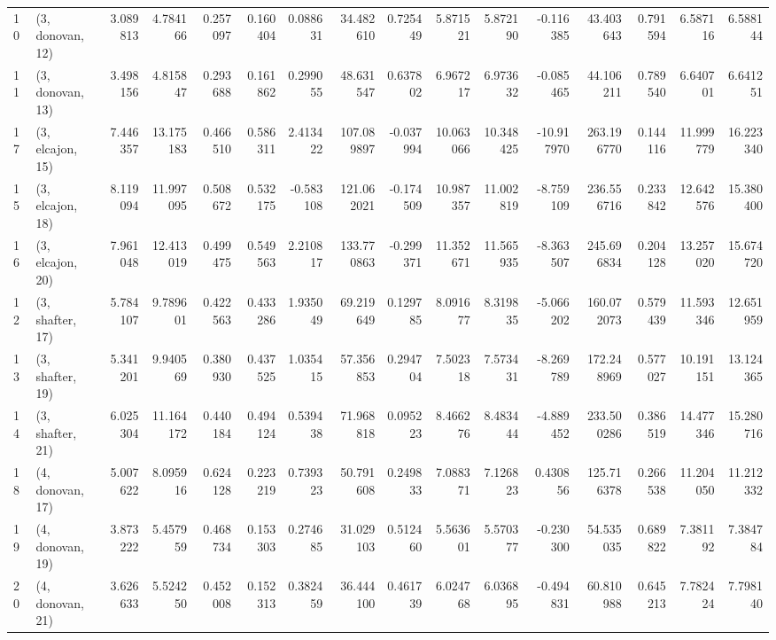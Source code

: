 \begin{tabular}{llrrrrrrrrrrrrrr}
10 &  (3, donovan, 12) &   3.089813 &   4.784166 &   0.257097 &  0.160404 &  0.088631 &   34.482610 &  0.725449 &   5.871521 &   5.872190 &  -0.116385 &   43.403643 &  0.791594 &   6.587116 &   6.588144 \\
11 &  (3, donovan, 13) &   3.498156 &   4.815847 &   0.293688 &  0.161862 &  0.299055 &   48.631547 &  0.637802 &   6.967217 &   6.973632 &  -0.085465 &   44.106211 &  0.789540 &   6.640701 &   6.641251 \\
17 &  (3, elcajon, 15) &   7.446357 &  13.175183 &   0.466510 &  0.586311 &  2.413422 &  107.089897 & -0.037994 &  10.063066 &  10.348425 & -10.917970 &  263.196770 &  0.144116 &  11.999779 &  16.223340 \\
15 &  (3, elcajon, 18) &   8.119094 &  11.997095 &   0.508672 &  0.532175 & -0.583108 &  121.062021 & -0.174509 &  10.987357 &  11.002819 &  -8.759109 &  236.556716 &  0.233842 &  12.642576 &  15.380400 \\
16 &  (3, elcajon, 20) &   7.961048 &  12.413019 &   0.499475 &  0.549563 &  2.210817 &  133.770863 & -0.299371 &  11.352671 &  11.565935 &  -8.363507 &  245.696834 &  0.204128 &  13.257020 &  15.674720 \\
12 &  (3, shafter, 17) &   5.784107 &   9.789601 &   0.422563 &  0.433286 &  1.935049 &   69.219649 &  0.129785 &   8.091677 &   8.319835 &  -5.066202 &  160.072073 &  0.579439 &  11.593346 &  12.651959 \\
13 &  (3, shafter, 19) &   5.341201 &   9.940569 &   0.380930 &  0.437525 &  1.035415 &   57.356853 &  0.294704 &   7.502318 &   7.573431 &  -8.269789 &  172.248969 &  0.577027 &  10.191151 &  13.124365 \\
14 &  (3, shafter, 21) &   6.025304 &  11.164172 &   0.440184 &  0.494124 &  0.539438 &   71.968818 &  0.095223 &   8.466276 &   8.483444 &  -4.889452 &  233.500286 &  0.386519 &  14.477346 &  15.280716 \\
18 &  (4, donovan, 17) &   5.007622 &   8.095916 &   0.624128 &  0.223219 &  0.739323 &   50.791608 &  0.249833 &   7.088371 &   7.126823 &   0.430856 &  125.716378 &  0.266538 &  11.204050 &  11.212332 \\
19 &  (4, donovan, 19) &   3.873222 &   5.457959 &   0.468734 &  0.153303 &  0.274685 &   31.029103 &  0.512460 &   5.563601 &   5.570377 &  -0.230300 &   54.535035 &  0.689822 &   7.381192 &   7.384784 \\
20 &  (4, donovan, 21) &   3.626633 &   5.524250 &   0.452008 &  0.152313 &  0.382459 &   36.444100 &  0.461739 &   6.024768 &   6.036895 &  -0.494831 &   60.810988 &  0.645213 &   7.782424 &   7.798140 \\

\end{tabular}
